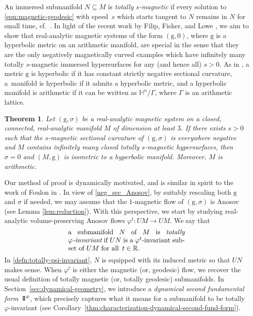 \documentclass[pdftex]{sigma}
\newcommand{\g}{\mathrm{g}}
\newcommand{\R}{\mathbb{R}}
\numberwithin{equation}{section}
\newtheorem{theoremA}{Theorem}
\theoremstyle{definition}
\begin{document}
An immersed submanifold $N \subseteq M$ is \emph{totally $s$-magnetic} if every solution to \eqref{eqn:magnetic-geodesic} with speed~$s$ which starts tangent to $N$ remains in $N$ for small time, cf.\ \cite[Definition 6.5]{ABM_2025}. In light of the recent work by Filip, Fisher, and Lowe \cite[Theorem 1]{filip2024finiteness}, we aim to show that real-analytic magnetic systems of the form $(\g, 0)$, where $\g$ is a hyperbolic metric on an arithmetic manifold, are special in the sense that they are the only negatively magnetically curved examples which have infinitely many totally $s$-magnetic immersed hypersurfaces for any (and hence all) $s > 0$. As in \cite{filip2024finiteness}, a metric $\g$ is hyperbolic if it has constant strictly negative sectional curvature, a~manifold is hyperbolic if it admits a hyperbolic metric, and a hyperbolic manifold is arithmetic if it can be written as $\mathbb{H}^n/\Gamma$, where $\Gamma$ is an arithmetic lattice.

\begin{theoremA} \label{thm:magnetic-finiteness}
 Let $(\g, \sigma)$ be a real-analytic magnetic system on a closed, connected, real-analytic manifold $M$ of dimension at least $3$. If there exists $s > 0$ such that the $s$-magnetic sectional curvature of $(\g, \sigma)$ is everywhere negative and $M$ contains infinitely many closed totally \mbox{$s$-magnetic}
 hypersurfaces, then $\sigma = 0$ and $(M,\g)$ is isometric to a hyperbolic manifold. Moreover, $M$ is arithmetic.
\end{theoremA}

Our method of proof is dynamically motivated, and is similar in spirit to the work of Foulon in \cite{foulon}. In view of \eqref{neg_sec_Anosov}, by suitably rescaling both $\g$ and $\sigma$ if needed, we may assume that the $1$-magnetic flow of $(\g, \sigma)$ is Anosov (see Lemma \ref{lem:reduction}). With this perspective, we start by studying
real-analytic volume-preserving Anosov flows $\varphi^t \colon UM \rightarrow UM$. We say that
\begin{equation}\label{defn:totally-psi-invariant}
 \parbox{.5\textwidth}{a submanifold $N$ of $M$ is \emph{totally \mbox{$\varphi$-in\-va\-ri\-ant}} if $UN$ is a $\varphi^t$-invariant subset of $UM$ for all $\,t\in \R$.}
\end{equation}
In \eqref{defn:totally-psi-invariant}, $N$ is equipped with its induced metric so that $UN$ makes sense.
When $\varphi^t$ is either the magnetic (or, geodesic) flow, we recover the usual definition of totally magnetic (or, totally geodesic) submanifolds.
In Section~\ref{sec:dynamical-geometry}, we introduce a \emph{dynamical second fundamental form}~${\rm I\!I}^\varphi$, which precisely captures what it means for a submanifold to be totally $\varphi$-invariant (see Corollary~\ref{thm:characterization-dynamical-second-fund-form}).
\end{document}
